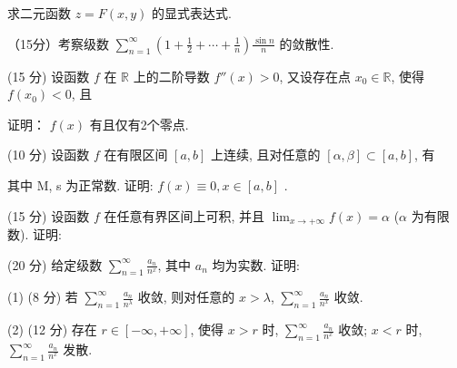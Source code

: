 求二元函数  $z = F(x, y)$  的显式表达式.\par
\par{}
（15分）考察级数 $\sum_{n=1}^{\infty}\left(1 + \frac{1}{2} + \cdots + \frac{1}{n}\right)\frac{\sin n}{n}$ 的敛散性.\par
\par{}
\par{}
(15 分) 设函数 $f$ 在 $\mathbb{R}$ 上的二阶导数 $f''(x) > 0$, 又设存在点 $x_0 \in \mathbb{R}$, 使得 $f(x_0) < 0$, 且\par
\nopagebreak[4]
证明： $f(x)$ 有且仅有2个零点.\par
\par{}
\par{}
(10 分) 设函数 $f$ 在有限区间 $[a, b]$ 上连续, 且对任意的 $[\alpha, \beta] \subset [a, b]$, 有\par
\nopagebreak[4]
其中 M, s 为正常数. 证明:  $f(x) \equiv 0, x \in [a, b]$ .\par
\par{}
\par{}
(15 分) 设函数 $f$ 在任意有界区间上可积, 并且 $\lim_{x \to +\infty} f(x) = \alpha$ ($\alpha$ 为有限数). 证明:\par
\nopagebreak[4]
\par{}
(20 分) 给定级数 $\sum_{n=1}^{\infty} \frac{a_n}{n^x}$, 其中 $a_n$ 均为实数. 证明:\par
(1) (8 分) 若 $\sum_{n=1}^{\infty} \frac{a_n}{n^\lambda}$ 收敛, 则对任意的 $x > \lambda$, $\sum_{n=1}^{\infty} \frac{a_n}{n^x}$ 收敛.\par
(2) (12 分) 存在 $r \in [-\infty, +\infty]$, 使得 $x > r$ 时, $\sum_{n=1}^{\infty} \frac{a_n}{n^x}$ 收敛; $x < r$ 时, $\sum_{n=1}^{\infty} \frac{a_n}{n^x}$ 发散.\par
